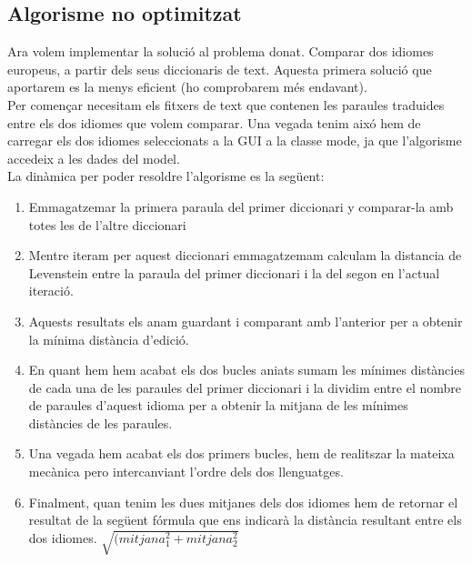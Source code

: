 \documentclass[conference]{IEEEtran}
\begin{document}
 \subsection{Algorisme no optimitzat}
 Ara volem implementar la solució al problema donat. Comparar dos idiomes europeus, a partir dels seus diccionaris de text. Aquesta primera solució que aportarem es la menys eficient (ho comprobarem més endavant).\\
 
 Per començar necesitam els fitxers de text que contenen les paraules traduides entre els dos idiomes que volem comparar. Una vegada tenim aixó hem de carregar els dos idiomes seleccionats a la GUI a la classe mode, ja que l'algorisme accedeix a les dades del model.\\
 La dinàmica per poder resoldre l'algorisme es la següent:
 \begin{enumerate}
     \item Emmagatzemar la primera paraula del primer diccionari y comparar-la amb totes les de l'altre diccionari
     \item Mentre iteram per aquest diccionari emmagatzemam calculam la distancia de Levenstein entre la paraula del primer diccionari i la del segon en l'actual iteració.
     \item Aquests resultats els anam guardant i comparant amb l'anterior per a obtenir la mínima distància d'edició.
     \item En quant hem hem acabat els dos bucles aniats sumam les mínimes distàncies de cada una de les paraules del primer diccionari i la dividim entre el nombre de paraules d'aquest idioma per a obtenir la mitjana de les mínimes distàncies de les paraules.
     \item Una vegada hem acabat els dos primers bucles, hem de realitszar la mateixa mecànica pero intercanviant l'ordre dels dos llenguatges.
     \item Finalment, quan tenim les dues mitjanes dels dos idiomes hem de retornar el resultat de la següent fórmula que ens indicarà la distància resultant entre els dos idiomes.
     $\sqrt{(mitjana_1^2+mitjana_2^2}$
 \end{enumerate}
\end{document}
